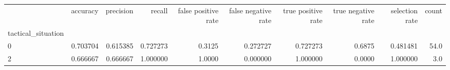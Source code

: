 \begin{tabular}{lrrrrrrrrr}
\toprule
{} &  accuracy &  precision &    recall &  false positive rate &  false negative rate &  true positive rate &  true negative rate &  selection rate &  count \\
tactical\_situation &           &            &           &                      &                      &                     &                     &                 &        \\
\midrule
0                  &  0.703704 &   0.615385 &  0.727273 &               0.3125 &             0.272727 &            0.727273 &              0.6875 &        0.481481 &   54.0 \\
2                  &  0.666667 &   0.666667 &  1.000000 &               1.0000 &             0.000000 &            1.000000 &              0.0000 &        1.000000 &    3.0 \\
\bottomrule
\end{tabular}
